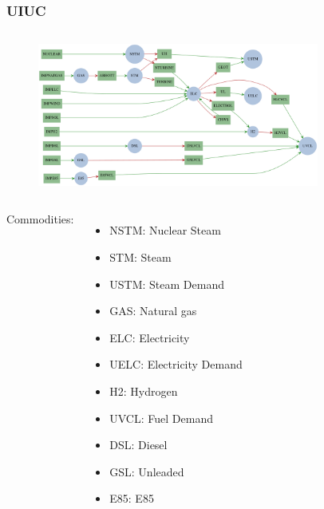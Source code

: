 \begin{frame}
\frametitle{UIUC}

	\begin{columns}
	\begin{figure}[htbp!]
		\begin{center}
			\includegraphics[height=4.7cm]{images/scenario11.png}
		\end{center}
	\end{figure}
	\end{columns}

	\begin{columns}
	\column[t]{3.cm}

	Commodities:
	\begin{itemize}
		\item NSTM: Nuclear Steam
		\item STM: Steam
		\item USTM: Steam Demand 
		\item GAS: Natural gas
		\item ELC: Electricity
		\item UELC: Electricity Demand
		\item H2: Hydrogen
		\item UVCL: Fuel Demand
		\item DSL: Diesel
		\item GSL: Unleaded
		\item E85: E85
	\end{itemize}
	\end{columns}

\end{frame}




